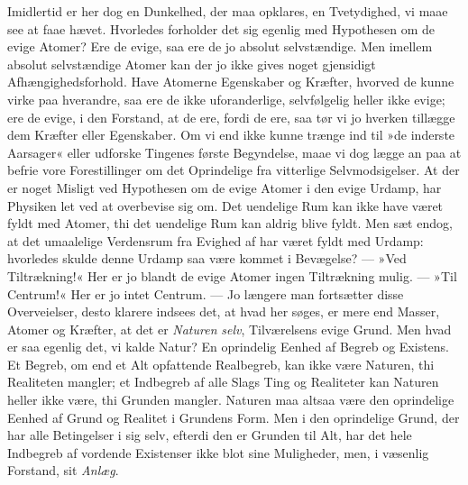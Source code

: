 \documentclass[12pt]{book}
\newcommand{\apage}[1]{\marginnote{\footnotesize\textit{[#1]}}}
\begin{document}
Imidlertid er her dog en Dunkelhed, der maa opklares, en Tvetydighed, vi
maae see at faae hævet. Hvorledes forholder det sig egenlig med Hypothesen
om de evige Atomer? Ere de evige, saa ere de jo absolut selvstændige. Men
imellem absolut selvstændige Atomer kan der jo ikke gives noget gjensidigt
Afhængighedsforhold. Have Atomerne Egenskaber og Kræfter, hvorved de kunne
virke paa hverandre, saa ere de ikke uforanderlige, selvfølgelig heller
ikke evige; ere de evige, i den Forstand, at de ere, fordi de ere, saa tør
vi jo hverken tillægge dem Kræfter eller Egenskaber. Om vi end ikke kunne
trænge ind til »de inderste Aarsager« eller udforske Tingenes første
Begyndelse, maae vi dog lægge an paa at befrie vore Forestillinger om det
Oprindelige fra vitterlige Selvmodsigelser. At der er noget Misligt ved
Hypothesen om de evige Atomer i den evige Urdamp, har Physiken let ved at
overbevise sig om. Det uendelige Rum kan ikke have været fyldt med Atomer,
thi det uendelige Rum kan aldrig blive fyldt. Men sæt endog, at det
umaalelige Verdensrum fra Evighed af har været fyldt med Urdamp: hvorledes
skulde denne Urdamp saa være kommet i Bevægelse? --- »Ved Tiltrækning!«
Her er jo blandt de evige Atomer ingen Tiltrækning mulig. --- »Til
Centrum!« Her er jo intet Centrum. --- Jo længere man fortsætter disse
Overveielser, desto klarere indsees det, at hvad her søges, er mere end
Masser, Atomer og Kræfter, at det er \emph{Naturen} \emph{selv}, \apage{169} Tilværelsens evige
Grund. Men hvad er saa egenlig det, vi kalde Natur? En oprindelig Eenhed af
Begreb og Existens. Et Begreb, om end et Alt opfattende Realbegreb, kan
ikke være Naturen, thi Realiteten mangler; et Indbegreb af alle Slags Ting
og Realiteter kan Naturen heller ikke være, thi Grunden mangler. Naturen
maa altsaa være den oprindelige Eenhed af Grund og Realitet i Grundens
Form. Men i den oprindelige Grund, der har alle Betingelser i sig selv,
efterdi den er Grunden til Alt, har det hele Indbegreb af vordende
Existenser ikke blot sine Muligheder, men, i væsenlig Forstand, sit \emph{Anlæg}.
\end{document}
